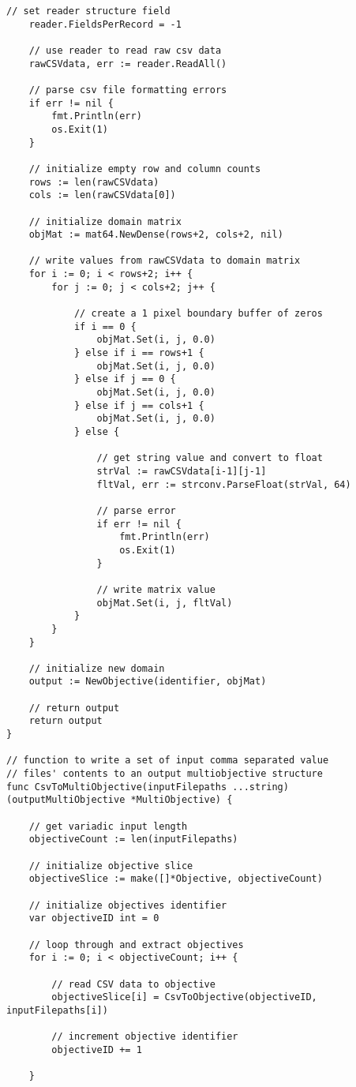 \begin{lstlisting}[basicstyle=\tiny]
	// set reader structure field
	reader.FieldsPerRecord = -1

	// use reader to read raw csv data
	rawCSVdata, err := reader.ReadAll()

	// parse csv file formatting errors
	if err != nil {
		fmt.Println(err)
		os.Exit(1)
	}

	// initialize empty row and column counts
	rows := len(rawCSVdata)
	cols := len(rawCSVdata[0])

	// initialize domain matrix
	objMat := mat64.NewDense(rows+2, cols+2, nil)

	// write values from rawCSVdata to domain matrix
	for i := 0; i < rows+2; i++ {
		for j := 0; j < cols+2; j++ {

			// create a 1 pixel boundary buffer of zeros
			if i == 0 {
				objMat.Set(i, j, 0.0)
			} else if i == rows+1 {
				objMat.Set(i, j, 0.0)
			} else if j == 0 {
				objMat.Set(i, j, 0.0)
			} else if j == cols+1 {
				objMat.Set(i, j, 0.0)
			} else {

				// get string value and convert to float
				strVal := rawCSVdata[i-1][j-1]
				fltVal, err := strconv.ParseFloat(strVal, 64)

				// parse error
				if err != nil {
					fmt.Println(err)
					os.Exit(1)
				}

				// write matrix value
				objMat.Set(i, j, fltVal)
			}
		}
	}

	// initialize new domain
	output := NewObjective(identifier, objMat)

	// return output
	return output
}

// function to write a set of input comma separated value
// files' contents to an output multiobjective structure
func CsvToMultiObjective(inputFilepaths ...string) (outputMultiObjective *MultiObjective) {

	// get variadic input length
	objectiveCount := len(inputFilepaths)

	// initialize objective slice
	objectiveSlice := make([]*Objective, objectiveCount)

	// initialize objectives identifier
	var objectiveID int = 0

	// loop through and extract objectives
	for i := 0; i < objectiveCount; i++ {

		// read CSV data to objective
		objectiveSlice[i] = CsvToObjective(objectiveID, inputFilepaths[i])

		// increment objective identifier
		objectiveID += 1

	}


\end{lstlisting}

